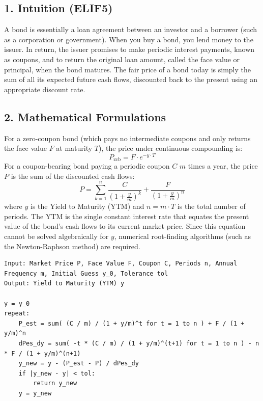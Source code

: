 \documentclass[11pt,oneside]{book}
\begin{document}
\subsection{1. Intuition (ELIF5)}
A bond is essentially a loan agreement between an investor and a borrower (such as a corporation or government). When you buy a bond, you lend money to the issuer. In return, the issuer promises to make periodic interest payments, known as coupons, and to return the original loan amount, called the face value or principal, when the bond matures. The fair price of a bond today is simply the sum of all its expected future cash flows, discounted back to the present using an appropriate discount rate.

\subsection{2. Mathematical Formulations}
For a zero-coupon bond (which pays no intermediate coupons and only returns the face value $F$ at maturity $T$), the price under continuous compounding is:
$$P_{\text{zcb}} = F \cdot e^{-y \cdot T}$$
For a coupon-bearing bond paying a periodic coupon $C$ $m$ times a year, the price $P$ is the sum of the discounted cash flows:
$$P = \sum_{k=1}^{n} \frac{C}{\left(1 + \frac{y}{m}\right)^k} + \frac{F}{\left(1 + \frac{y}{m}\right)^n}$$
where $y$ is the Yield to Maturity (YTM) and $n = m \cdot T$ is the total number of periods. The YTM is the single constant interest rate that equates the present value of the bond's cash flows to its current market price. Since this equation cannot be solved algebraically for $y$, numerical root-finding algorithms (such as the Newton-Raphson method) are required.

\begin{tcolorbox}[colback=white,colframe=black,boxrule=0.6pt,arc=0mm,title=Newton-Raphson YTM Solver]
\begin{verbatim}
Input: Market Price P, Face Value F, Coupon C, Periods n, Annual Frequency m, Initial Guess y_0, Tolerance tol
Output: Yield to Maturity (YTM) y

y = y_0
repeat:
    P_est = sum( (C / m) / (1 + y/m)^t for t = 1 to n ) + F / (1 + y/m)^n
    dPes_dy = sum( -t * (C / m) / (1 + y/m)^(t+1) for t = 1 to n ) - n * F / (1 + y/m)^(n+1)
    y_new = y - (P_est - P) / dPes_dy
    if |y_new - y| < tol:
        return y_new
    y = y_new
\end{verbatim}
\end{tcolorbox}
\end{document}
